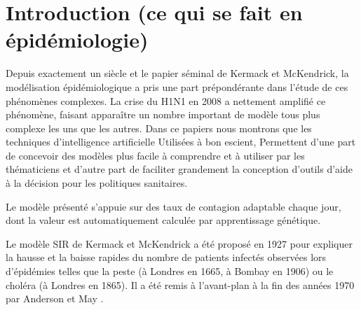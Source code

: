 \documentclass[review]{elsarticle}
\begin{document}
\linenumbers

\section{Introduction (ce qui se fait en épidémiologie)}

Depuis exactement un siècle et le papier séminal de Kermack et
McKendrick, la modélisation épidémiologique a pris une part
prépondérante dans l’étude de ces phénomènes complexes. La crise du
H1N1 en 2008 a nettement amplifié ce phénomène, faisant apparaître un
nombre important de modèle tous plus complexe les uns que les
autres. Dans ce papiers nous montrons que les techniques
d’intelligence artificielle Utilisées à bon escient, Permettent d’une
part de concevoir des modèles plus facile à comprendre et à utiliser
par les thématiciens et d’autre part de faciliter grandement la
conception d’outils d’aide à la décision pour les politiques
sanitaires.


Le modèle présenté s'appuie sur des taux de contagion
adaptable chaque jour, dont la valeur est automatiquement calculée par
apprentissage génétique.



Le modèle SIR de Kermack et McKendrick \cite{} a été proposé en 1927 pour expliquer la hausse et la baisse rapides du nombre de patients infectés observées lors d’épidémies telles que la peste (à Londres en 1665, à Bombay en 1906) ou le choléra (à Londres en 1865). Il a été remis à l’avant-plan à la fin des années 1970 par Anderson et May \cite{}.


\bigskip


\hfill {} \hfill \
\end{document}
